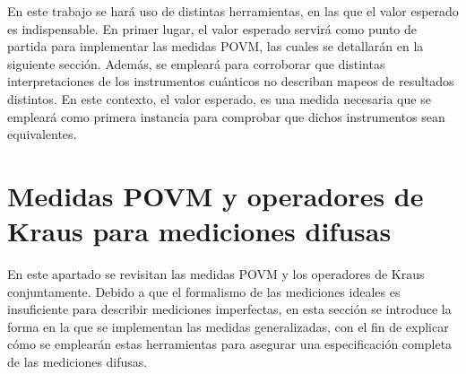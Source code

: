 En este trabajo se hará uso de distintas herramientas, en las que el valor
esperado es indispensable. En primer lugar, el valor esperado servirá como
punto de partida para implementar las medidas POVM, las cuales se detallarán en
la siguiente sección. Además, se empleará para corroborar que distintas
interpretaciones de los instrumentos cuánticos no describan mapeos de
resultados distintos.  En este contexto, el valor esperado, es una medida
necesaria que se empleará como primera instancia para comprobar que dichos
instrumentos sean equivalentes.

\section{Medidas POVM y operadores de Kraus para mediciones difusas}\label{sec:Cap2POVM_Kraus_mediciones_difusas} %


En este apartado se revisitan las medidas POVM y los operadores de Kraus
conjuntamente. Debido a que el formalismo de las mediciones ideales es
insuficiente para describir mediciones imperfectas, en esta sección se
introduce la forma en la que se implementan las medidas generalizadas, con el
fin de explicar cómo se emplearán estas herramientas para asegurar una
especificación completa de las mediciones difusas.


